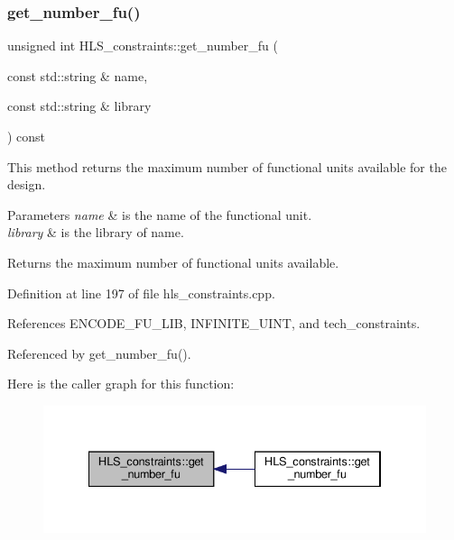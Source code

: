 \subsubsection{\texorpdfstring{get\+\_\+number\+\_\+fu()}{get\_number\_fu()}\hspace{0.1cm}{\footnotesize\ttfamily [1/2]}}
{\footnotesize\ttfamily unsigned int H\+L\+S\+\_\+constraints\+::get\+\_\+number\+\_\+fu (\begin{DoxyParamCaption}\item[{const std\+::string \&}]{name,  }\item[{const std\+::string \&}]{library }\end{DoxyParamCaption}) const}



This method returns the maximum number of functional units available for the design. 


\begin{DoxyParams}{Parameters}
{\em name} & is the name of the functional unit. \\
\hline
{\em library} & is the library of name. \\
\hline
\end{DoxyParams}
\begin{DoxyReturn}{Returns}
the maximum number of functional units available. 
\end{DoxyReturn}


Definition at line 197 of file hls\+\_\+constraints.\+cpp.



References E\+N\+C\+O\+D\+E\+\_\+\+F\+U\+\_\+\+L\+IB, I\+N\+F\+I\+N\+I\+T\+E\+\_\+\+U\+I\+NT, and tech\+\_\+constraints.



Referenced by get\+\_\+number\+\_\+fu().

Here is the caller graph for this function\+:
\nopagebreak
\begin{figure}[H]
\begin{center}
\leavevmode
\includegraphics[width=334pt]{dd/d96/classHLS__constraints_a5ffda80abbda1488aaacca937993df74_icgraph}
\end{center}
\end{figure}
\mbox{\label{classHLS__constraints_a6add734962a7ab1a103e95e9bb87cc30}} 
